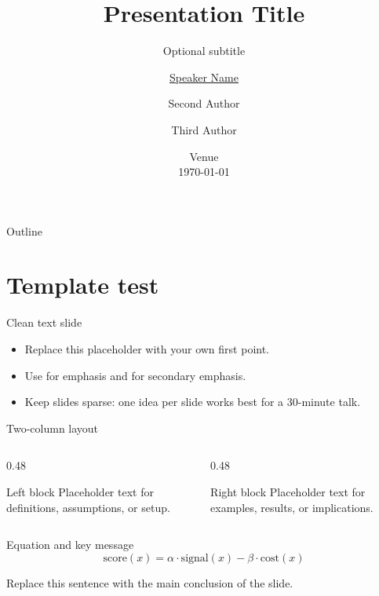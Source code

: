 \documentclass[aspectratio=169,11pt,t]{beamer}
\title[Short title]{Presentation Title}
\subtitle{Optional subtitle}
\author[Speaker]{\underline{Speaker Name} \and Second Author \and Third Author}
\institute[IMT Lucca]{IMT School for Advanced Studies Lucca}
\date{Venue \\ \today}
\begin{document}
\begin{frame}
  \titlepage%
\end{frame}

\begin{frame}{Outline}
  \tableofcontents
\end{frame}

\section{Template test}

\begin{frame}{Clean text slide}
  \begin{itemize}
    \item Replace this placeholder with your own first point.
    \item Use  for emphasis and  for secondary emphasis.
    \item Keep slides sparse: one idea per slide works best for a 30-minute talk.
  \end{itemize}
\end{frame}

\begin{frame}{Two-column layout}
  \begin{columns}[T,onlytextwidth]
    \begin{column}{0.48\textwidth}
      \begin{block}{Left block}
        Placeholder text for definitions, assumptions, or setup.
      \end{block}
    \end{column}
    \begin{column}{0.48\textwidth}
      \begin{exampleblock}{Right block}
        Placeholder text for examples, results, or implications.
      \end{exampleblock}
    \end{column}
  \end{columns}
\end{frame}

\begin{frame}{Equation and key message}
  \begin{equation*}
    \text{score}(x) = \alpha \cdot \text{signal}(x) - \beta \cdot \text{cost}(x)
  \end{equation*}

  \vspace{3mm}
  \begin{takeawaybox}
    Replace this sentence with the main conclusion of the slide.
  \end{takeawaybox}
\end{frame}
\end{document}

